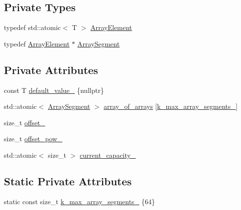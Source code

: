 \subsection*{Private Types}
\begin{DoxyCompactItemize}
\item 
typedef std\+::atomic$<$ T $>$ \hyperlink{classtervel_1_1containers_1_1wf_1_1vector_1_1_array_array_ac3a7367d6f8ead5417cafe0026e86481}{Array\+Element}
\item 
typedef \hyperlink{classtervel_1_1containers_1_1wf_1_1vector_1_1_array_array_ac3a7367d6f8ead5417cafe0026e86481}{Array\+Element} $\ast$ \hyperlink{classtervel_1_1containers_1_1wf_1_1vector_1_1_array_array_a7c46cf8d5a4df86d5d258f5e97069876}{Array\+Segment}
\end{DoxyCompactItemize}
\subsection*{Private Attributes}
\begin{DoxyCompactItemize}
\item 
const T \hyperlink{classtervel_1_1containers_1_1wf_1_1vector_1_1_array_array_ae234686849179edcb8834753b35a181f}{default\+\_\+value\+\_\+} \{nullptr\}
\item 
std\+::atomic$<$ \hyperlink{classtervel_1_1containers_1_1wf_1_1vector_1_1_array_array_a7c46cf8d5a4df86d5d258f5e97069876}{Array\+Segment} $>$ \hyperlink{classtervel_1_1containers_1_1wf_1_1vector_1_1_array_array_a3dda9f4ccf0846e5741c03c13ae3e2b1}{array\+\_\+of\+\_\+arrays} \mbox{[}\hyperlink{classtervel_1_1containers_1_1wf_1_1vector_1_1_array_array_aee96083ae205bf8a3e2c63520320b674}{k\+\_\+max\+\_\+array\+\_\+segments\+\_\+}\mbox{]}
\item 
size\+\_\+t \hyperlink{classtervel_1_1containers_1_1wf_1_1vector_1_1_array_array_aa658a2bedb822e44a645078afbba8d1f}{offset\+\_\+}
\item 
size\+\_\+t \hyperlink{classtervel_1_1containers_1_1wf_1_1vector_1_1_array_array_a914f36d1acd29dcda33665e08af09bca}{offset\+\_\+pow\+\_\+}
\item 
std\+::atomic$<$ size\+\_\+t $>$ \hyperlink{classtervel_1_1containers_1_1wf_1_1vector_1_1_array_array_add3378d0061344bf1d6cc8f684502cc4}{current\+\_\+capacity\+\_\+}
\end{DoxyCompactItemize}
\subsection*{Static Private Attributes}
\begin{DoxyCompactItemize}
\item 
static const size\+\_\+t \hyperlink{classtervel_1_1containers_1_1wf_1_1vector_1_1_array_array_aee96083ae205bf8a3e2c63520320b674}{k\+\_\+max\+\_\+array\+\_\+segments\+\_\+} \{64\}
\end{DoxyCompactItemize}


